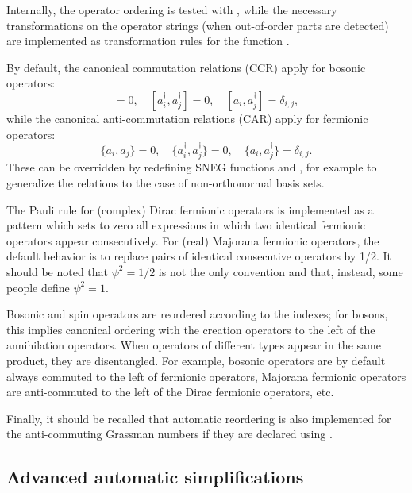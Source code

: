 \documentclass[3p,number,preprint]{elsarticle}
\begin{document}
Internally, the operator ordering is tested with ,
while the necessary transformations on the operator strings (when
out-of-order parts are detected) are implemented as transformation
rules for the function . 

By default, the canonical commutation relations (CCR) apply for
bosonic operators:
%
\begin{equation}
[a_i,a_j]=0,\quad [a_i^\dag,a_j^\dag]=0,\quad
[a_i,a_j^\dag]=\delta_{i,j},
\end{equation}
%
while the canonical anti-commutation relations (CAR) apply for fermionic
operators:
%
\begin{equation}
\{a_i,a_j\}=0,
\quad
\{a_i^\dag,a_j^\dag\}=0,
\quad
\{a_i,a_j^\dag\}=\delta_{i,j}.
\end{equation}
%
These can be overridden by redefining SNEG functions  and
, for example to generalize the relations to the case
of non-orthonormal basis sets.

The Pauli rule for (complex) Dirac fermionic operators is implemented
as a pattern which sets to zero all expressions in which two identical
fermionic operators appear consecutively. For (real) Majorana
fermionic operators, the default behavior is to replace pairs of
identical consecutive operators by 1/2. It should be noted that
$\psi^2=1/2$ is not the only convention and that, instead, some people
define $\psi^2=1$.

Bosonic and spin operators are reordered according to the indexes; for
bosons, this implies canonical ordering with the creation operators to
the left of the annihilation operators. When operators of different
types appear in the same product, they are disentangled. For example,
bosonic operators are by default always commuted to the left of
fermionic operators, Majorana fermionic operators are anti-commuted to
the left of the Dirac fermionic operators, etc.

Finally, it should be recalled that automatic reordering is also
implemented for the anti-commuting Grassman numbers if they
are declared using .


\subsection{Advanced automatic simplifications}
\end{document}
